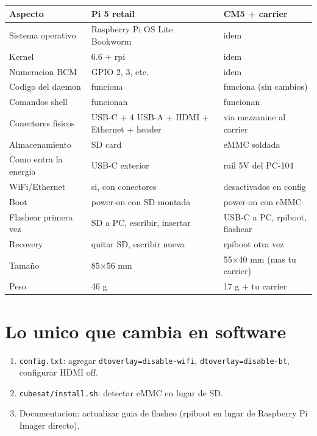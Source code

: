 \documentclass[11pt,a4paper,oneside,openright]{book}
\begin{document}
\begin{center}
\begin{tabular}{p{4cm}p{5cm}p{5cm}}
\toprule
\textbf{Aspecto} & \textbf{Pi 5 retail} & \textbf{CM5 + carrier} \\
\midrule
Sistema operativo     & Raspberry Pi OS Lite Bookworm & idem \\
Kernel                & 6.6 + rpi & idem \\
Numeracion BCM        & GPIO 2, 3, etc. & idem \\
Codigo del daemon     & funciona & funciona (sin cambios) \\
Comandos shell        & funcionan & funcionan \\
Conectores fisicos    & USB-C + 4 USB-A + HDMI + Ethernet + header & via mezzanine al carrier \\
Almacenamiento        & SD card & eMMC soldada \\
Como entra la energia & USB-C exterior & rail 5V del PC-104 \\
WiFi/Ethernet         & si, con conectores & desactivados en config \\
Boot                  & power-on con SD montada & power-on con eMMC \\
Flashear primera vez  & SD a PC, escribir, insertar & USB-C a PC, rpiboot, flashear \\
Recovery              & quitar SD, escribir nueva & rpiboot otra vez \\
Tamaño                & 85$\times$56 mm & 55$\times$40 mm (mas tu carrier) \\
Peso                  & 46 g & 17 g + tu carrier \\
\bottomrule
\end{tabular}
\end{center}

\section{Lo unico que cambia en software}

\begin{enumerate}[leftmargin=2em]
  \item \texttt{config.txt}: agregar \texttt{dtoverlay=disable-wifi},
        \texttt{dtoverlay=disable-bt}, configurar HDMI off.
  \item \texttt{cubesat/install.sh}: detectar eMMC en lugar de SD.
  \item Documentacion: actualizar guia de flasheo (rpiboot en lugar de
        Raspberry Pi Imager directo).
\end{enumerate}
\end{document}
